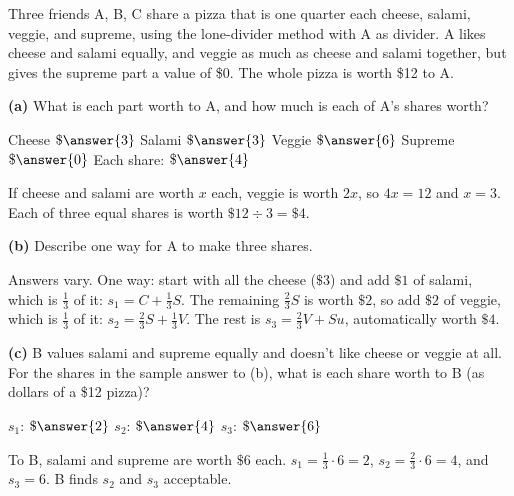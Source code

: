 \documentclass[12pt]{ximera}
\begin{document}
\begin{problem}
Three friends A, B, C share a pizza that is one quarter each cheese, salami, veggie, and
supreme, using the lone-divider method with A as divider. A likes cheese and salami
equally, and veggie as much as cheese and salami together, but gives the supreme part a
value of \$0. The whole pizza is worth \$12 to A.

\begin{prompt}
\textbf{(a)} What is each part worth to A, and how much is each of A's shares worth?

Cheese $\$\answer{3}$ \quad Salami $\$\answer{3}$ \quad Veggie $\$\answer{6}$ \quad
Supreme $\$\answer{0}$ \qquad Each share: $\$\answer{4}$
\begin{feedback}
If cheese and salami are worth $x$ each, veggie is worth $2x$, so $4x=12$ and $x=3$.
Each of three equal shares is worth $\$12\div3=\$4$.
\end{feedback}
\end{prompt}

\begin{prompt}
\textbf{(b)} Describe one way for A to make three shares.
\begin{freeResponse}
\end{freeResponse}
\begin{feedback}
Answers vary. One way: start with all the cheese ($\$3$) and add $\$1$ of salami, which
is $\frac13$ of it: $s_1=C+\frac13S$. The remaining $\frac23S$ is worth $\$2$, so add
$\$2$ of veggie, which is $\frac13$ of it: $s_2=\frac23S+\frac13V$. The rest is
$s_3=\frac23V+Su$, automatically worth $\$4$.
\end{feedback}
\end{prompt}

\begin{prompt}
\textbf{(c)} B values salami and supreme equally and doesn't like cheese or veggie at
all. For the shares in the sample answer to (b), what is each share worth to B (as
dollars of a \$12 pizza)?

$s_1$: $\$\answer{2}$ \quad $s_2$: $\$\answer{4}$ \quad $s_3$: $\$\answer{6}$
\begin{feedback}
To B, salami and supreme are worth $\$6$ each. $s_1=\frac13\cdot6=2$,
$s_2=\frac23\cdot6=4$, and $s_3=6$. B finds $s_2$ and $s_3$ acceptable.
\end{feedback}
\end{prompt}
\end{problem}
\end{document}
